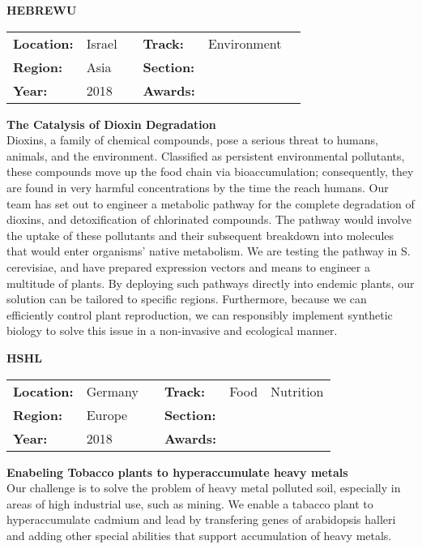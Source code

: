 \textbf{\uppercase{HebrewU}}
\FloatBarrier
\begin{table}[h]
\begin{tabular}{lp{2.5cm}llll}
\textbf{Location:} & Israel & \multicolumn{1}{|l}{} & \textbf{Track:}   & Environment \\
\textbf{Region:}   & Asia   & \multicolumn{1}{|l}{} & \textbf{Section:} &  \\
\textbf{Year:}     & 2018   & \multicolumn{1}{|l}{} & \textbf{Awards:}  &
\end{tabular}
\end{table}
\FloatBarrier
\noindent	\textbf{The Catalysis of Dioxin Degradation } \vspace{.2cm}\\
Dioxins, a family of chemical compounds, pose a serious threat to humans, animals, and the environment. Classified as persistent environmental pollutants, these compounds move up the food chain via bioaccumulation; consequently, they are found in very harmful concentrations by the time the reach humans. Our team has set out to engineer a metabolic pathway for the complete degradation of dioxins, and detoxification of chlorinated compounds. The pathway would involve the uptake of these pollutants and their subsequent breakdown into molecules that would enter organisms’ native metabolism. We are testing the pathway in S. cerevisiae, and have prepared expression vectors and means to engineer a multitude of plants. By deploying such pathways directly into endemic plants, our solution can be tailored to specific regions. Furthermore, because we can efficiently control plant reproduction, we can responsibly implement synthetic biology to solve this issue in a non-invasive and ecological manner. 
\vspace{2cm}


\textbf{\uppercase{HSHL}}
\FloatBarrier
\begin{table}[h]
\begin{tabular}{lp{2.5cm}llll}
\textbf{Location:} & Germany & \multicolumn{1}{|l}{} & \textbf{Track:}   & Food & Nutrition \\
\textbf{Region:}   & Europe   & \multicolumn{1}{|l}{} & \textbf{Section:} &  \\
\textbf{Year:}     & 2018   & \multicolumn{1}{|l}{} & \textbf{Awards:}  &
\end{tabular}
\end{table}
\FloatBarrier
\noindent	\textbf{Enabeling Tobacco plants to hyperaccumulate heavy metals } \vspace{.2cm}\\
Our challenge is to solve the problem of heavy metal polluted soil, especially in areas of high industrial use, such as mining. 
We enable a tabacco plant to hyperaccumulate cadmium and lead by transfering genes of arabidopsis halleri and adding other special abilities that support accumulation of heavy metals.
\vspace{2cm} $ $
\pagebreak

